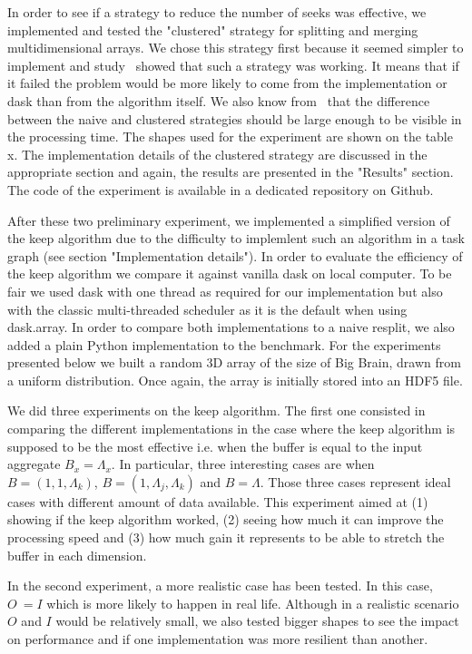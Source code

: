 \documentclass[conference]{IEEEtran}
\begin{document}
In order to see if a strategy to reduce the number of seeks was effective, we
implemented and tested the "clustered" strategy for splitting and merging
multidimensional arrays. We chose this strategy first because it seemed simpler
to implement and study~\cite{seqalgorithms} showed that such a strategy was
working. It means that if it failed the problem would be more likely to come
from the implementation or dask than from the algorithm itself. We also know
from~\cite{seqalgorithms} that the difference between the naive and clustered
strategies should be large enough to be visible in the processing time. The
shapes used for the experiment are shown on the table x. The implementation
details of the clustered strategy are discussed in the appropriate section and
again, the results are presented in the "Results" section. The code of the
experiment is available in a dedicated repository on Github.

After these two preliminary experiment, we implemented a simplified version of
the keep algorithm due to the difficulty to implemlent such an algorithm in a
task graph (see section "Implementation details"). In order to evaluate the
efficiency of the keep algorithm we compare it against vanilla dask on local
computer. To be fair we used dask with one thread as required for our
implementation but also with the classic multi-threaded  scheduler as it is the
default when using dask.array. In order to compare both implementations to a
naive resplit, we also added a plain Python implementation to the benchmark. For
the experiments presented below we built a random 3D array of the size of Big
Brain, drawn from a uniform distribution. Once again, the array is initially
stored into an HDF5 file.

We did three experiments on the keep algorithm. The first one consisted in
comparing the different implementations in the case where the keep algorithm is
supposed to be the most effective i.e. when the buffer is equal to the input
aggregate $B_x=\Lambda_x$. In particular, three interesting cases are when
$B=(1,1,\Lambda_k)$, $B=(1,\Lambda_j, \Lambda_k)$ and $B=\Lambda$. Those three
cases represent ideal cases with different amount of data available. This
experiment aimed at (1) showing if the keep algorithm worked, (2) seeing how much it
can improve the processing speed and (3) how much gain it represents to be able to
stretch the buffer in each dimension.

In the second experiment, a more realistic case has been tested. In this case,
$O~=I$ which is more likely to happen in real life. Although in a realistic
scenario $O$ and $I$ would be relatively small, we also tested bigger shapes to
see the impact on performance and if one implementation was more resilient than
another.
\end{document}
